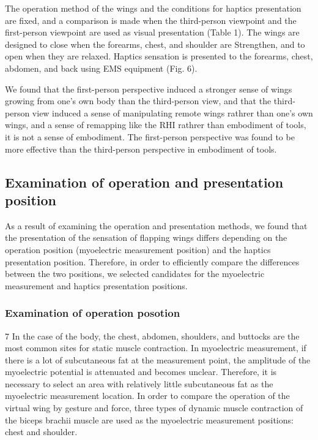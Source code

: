 \documentclass[letterpaper, 10 pt, conference]{ieeeconf}  %
\begin{document}
                        The operation method of the wings and the conditions for haptics presentation are fixed, and a comparison is made when the third-person viewpoint and the first-person viewpoint are used as visual presentation (Table 1).  
                        The wings are designed to close when the forearms, chest, and shoulder are Strengthen, and to open when they are relaxed.  
                        Haptics sensation is presented to the forearms, chest, abdomen, and back using EMS equipment (Fig. 6).  

                        We found that the first-person perspective induced a stronger sense of wings growing from one's own body than the third-person view, and that the third-person view induced a sense of manipulating remote wings rathrer than one's own wings, and a sense of remapping like the RHI rathrer than embodiment of tools, it is not a sense of embodiment. 
                        The first-person perspective was found to be more effective than the third-person perspective in embodiment of tools.  

        
        \subsection{Examination of operation and presentation position}
                As a result of examining the operation and presentation methods, we found that the presentation of the sensation of flapping wings differs depending on the operation position (myoelectric measurement position) and the haptics presentation position.  
                Therefore, in order to efficiently compare the differences between the two positions, we selected candidates for the myoelectric measurement and haptics presentation positions.  
                        
                \subsubsection{Examination of operation posotion}7
                        In the case of the body, the chest, abdomen, shoulders, and buttocks are the most common sites for static muscle contraction. 
                        In myoelectric measurement, if there is a lot of subcutaneous fat at the measurement point, the amplitude of the myoelectric potential is attenuated and becomes unclear. 
                        Therefore, it is necessary to select an area with relatively little subcutaneous fat as the myoelectric measurement location. 
                        In order to compare the operation of the virtual wing by gesture and force, three types of dynamic muscle contraction of the biceps brachii muscle are used as the myoelectric measurement positions: chest and shoulder.
\end{document}
